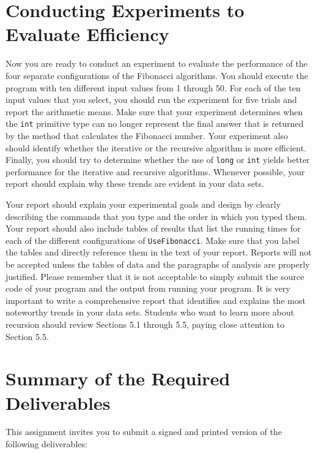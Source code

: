 \vspace*{-.05in}
\section*{Conducting Experiments to Evaluate Efficiency}
\vspace*{-.05in}

Now you are ready to conduct an experiment to evaluate the performance of the four separate configurations of the
Fibonacci algorithms. You should execute the program with ten different input values from 1 through 50. For each of the
ten input values that you select, you should run the experiment for five trials and report the arithmetic means. Make
sure that your experiment determines when the {\tt int} primitive type can no longer represent the final answer that is
returned by the method that calculates the Fibonacci number. Your experiment also should identify whether the iterative
or the recursive algorithm is more efficient.  Finally, you should try to determine whether the use of {\tt long} or
{\tt int} yields better performance for the iterative and recursive algorithms. Whenever possible, your report should
explain why these trends are evident in your data sets.

Your report should explain your experimental goals and design by clearly describing the commands that you type and the
order in which you typed them. Your report should also include tables of results that list the running times for each of
the different configurations of {\tt UseFibonacci}.  Make sure that you label the tables and directly reference them in
the text of your report. Reports will not be accepted unless the tables of data and the paragraphs of analysis are
properly justified. Please remember that it is not acceptable to simply submit the source code of your program and the
output from running your program. It is very important to write a comprehensive report that identifies and explains the
most noteworthy trends in your data sets. Students who want to learn more about recursion should review Sections 5.1
through 5.5, paying close attention to Section 5.5.

\section*{Summary of the Required Deliverables}

This assignment invites you to submit a signed and printed version of the following deliverables:


